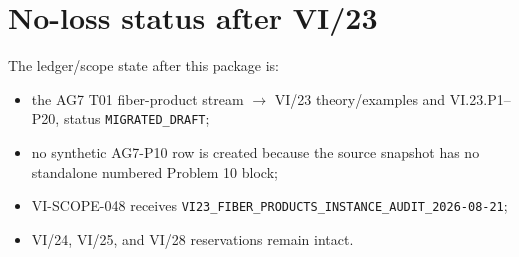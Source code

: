 \section*{No-loss status after VI/23}
The ledger/scope state after this package is:
\begin{itemize}
\item the AG7 T01 fiber-product stream $\to$ VI/23 theory/examples and VI.23.P1--P20,
status \texttt{MIGRATED\_DRAFT};
\item no synthetic AG7-P10 row is created because the source snapshot has no standalone numbered
Problem 10 block;
\item VI-SCOPE-048 receives
\texttt{VI23\_FIBER\_PRODUCTS\_INSTANCE\_AUDIT\_2026-08-21};
\item VI/24, VI/25, and VI/28 reservations remain intact.
\end{itemize}
